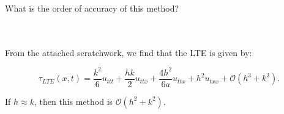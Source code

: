 What is the order of accuracy of this method?

\begin{solution}\ \\\\

    From the attached scratchwork, we find that the LTE is given by:

    $$
    \tau_{LTE}(x, t) = \frac{k^2}{6} u_{ttt} + \frac{hk}{2} u_{ttx} + \frac{4h^2}{6a} u_{ttx} + h^2 u_{txx} + \mathcal{O}(h^3 + k^3).
    $$

    If $h \approx k$, then this method is $\mathcal{O}(h^2 + k^2)$.
    \ \\
\end{solution}